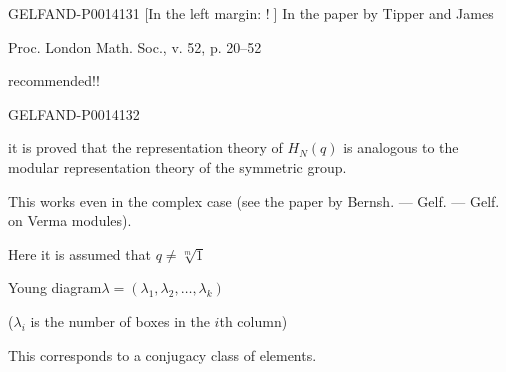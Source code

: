 \begin{GelfandAdjacentEvidence}{GELFAND-P001413}{1}
[In the left margin: \textcircled{!}]
In the paper by Tipper and James

Proc. London Math. Soc., v. 52, p. 20--52

recommended!!

\end{GelfandAdjacentEvidence}
\begin{GelfandAdjacentEvidence}{GELFAND-P001413}{2}


it is proved that the representation theory of \(H_N(q)\) is analogous to the modular representation theory of the symmetric group.

This works even in the complex case (see the paper by Bernsh. — Gelf. — Gelf. on Verma modules).

Here it is assumed that \(q\ne\sqrt[m]{1}\)


Young diagram\quad \(\lambda=(\lambda_1,\lambda_2,\ldots,\lambda_k)\)

\end{GelfandAdjacentEvidence}


(\(\lambda_i\) is the number of boxes in the \(i\)th column)

This corresponds to a conjugacy class of elements.


